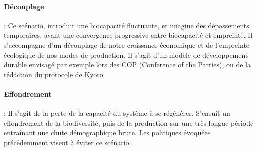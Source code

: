 \documentclass[../thesis.tex]{subfiles}
\begin{document}
    \vspace{-0.5em}
    \paragraph{Découplage} : Ce scénario, introduit une biocapacité fluctuante, et imagine des dépassements temporaires, avant une convergence progressive entre biocapacité et empreinte. Il s'accompagne d'un découplage de notre croissance économique et de l'empreinte écologique de nos modes de production. Il s'agit d'un modèle de développement durable envisagé par exemple lors des COP (Conference of the Parties), ou de la rédaction du protocole de Kyoto.
    
    \vspace{-0.5em}
    \paragraph{Effondrement} : Il s'agit de la perte de la capacité du système à se régénérer. S'ensuit un effondrement de la biodiversité, puis de la production sur une très longue période entraînant une chute démographique brute. Les politiques évoquées précédemment visent à éviter ce scénario. %
    
    
\end{document}
